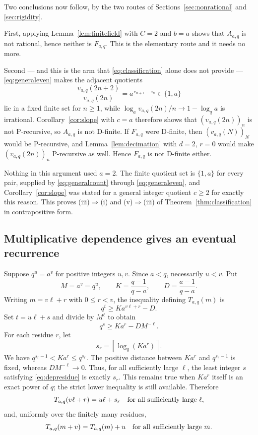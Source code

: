 \documentclass[11pt,letterpaper]{article}
\numberwithin{equation}{section}
\theoremstyle{definition}
\theoremstyle{remark}
\newcommand{\ceil}[1]{\left\lceil#1\right\rceil}
\begin{document}
Two conclusions now follow, by the two routes of
Sections~\ref{sec:nonrational} and \ref{sec:rigidity}.

First, applying Lemma~\ref{lem:finitefield} with $C=2$ and $b=a$ shows
that $A_{a,q}$ is not rational, hence neither is $F_{a,q}$. This is the
elementary route and it needs no more.

Second --- and this is the arm that \eqref{eq:classification} alone does
not provide --- \eqref{eq:generaleven} makes the adjacent quotients
\[
 \frac{v_{a,q}(2n+2)}{v_{a,q}(2n)}=a^{\,e_{n+1}-e_n}\in\{1,a\}
\]
lie in a fixed finite set for $n\ge1$, while
$\log_a v_{a,q}(2n)/n\to1-\log_qa$ is irrational. Corollary~\ref{cor:slope}
with $c=a$ therefore shows that $(v_{a,q}(2n))_n$ is not P-recursive, so
$A_{a,q}$ is not D-finite. If $F_{a,q}$ were D-finite, then
$(v_{a,q}(N))_N$ would be P-recursive, and Lemma~\ref{lem:decimation}
with $d=2$, $r=0$ would make $(v_{a,q}(2n))_n$ P-recursive as well. Hence
$F_{a,q}$ is not D-finite either.

Nothing in this argument used $a=2$. The finite quotient set is
$\{1,a\}$ for every pair, supplied by \eqref{eq:generalcount} through
\eqref{eq:generaleven}, and Corollary~\ref{cor:slope} was stated for a
general integer quotient $c\ge2$ for exactly this reason. This proves
(iii)$\Rightarrow$(i) and (v)$\Rightarrow$(iii) of
Theorem~\ref{thm:classification} in contrapositive form.

\subsection{Multiplicative dependence gives an eventual recurrence}
\label{sec:gendep}
Suppose $q^u=a^v$ for positive integers $u,v$. Since $a<q$, necessarily
$u<v$. Put
\[
 M=a^v=q^u,\qquad K=\frac{q-1}{q-a},\qquad D=\frac{a-1}{q-a}.
\]
Writing $m=v\ell+r$ with $0\le r<v$, the inequality defining
$T_{a,q}(m)$ is
\begin{equation}\label{eq:depfirst}
 q^t\ge K a^{v\ell+r}-D.
\end{equation}
Set $t=u\ell+s$ and divide by $M^\ell$ to obtain
\begin{equation}\label{eq:depresidue}
 q^s\ge K a^r-DM^{-\ell}.
\end{equation}
For each residue $r$, let
\begin{equation}\label{eq:sr}
 s_r=\ceil{\log_q(K a^r)}.
\end{equation}
We have $q^{s_r-1}<K a^r\le q^{s_r}$. The positive distance between
$K a^r$ and $q^{s_r-1}$ is fixed, whereas $DM^{-\ell}\to0$.
Thus, for all sufficiently large $\ell$, the least integer $s$ satisfying
\eqref{eq:depresidue} is exactly $s_r$.
This remains true when $K a^r$ itself is an exact power of $q$; the
strict lower inequality is still available.
Therefore
\begin{equation}\label{eq:thresholdperiod}
 T_{a,q}(v\ell+r)=u\ell+s_r
 \quad\hbox{for all sufficiently large $\ell$},
\end{equation}
and, uniformly over the finitely many residues,
\begin{equation}\label{eq:Tshift}
 T_{a,q}(m+v)=T_{a,q}(m)+u
 \quad\hbox{for all sufficiently large $m$}.
\end{equation}
\end{document}
